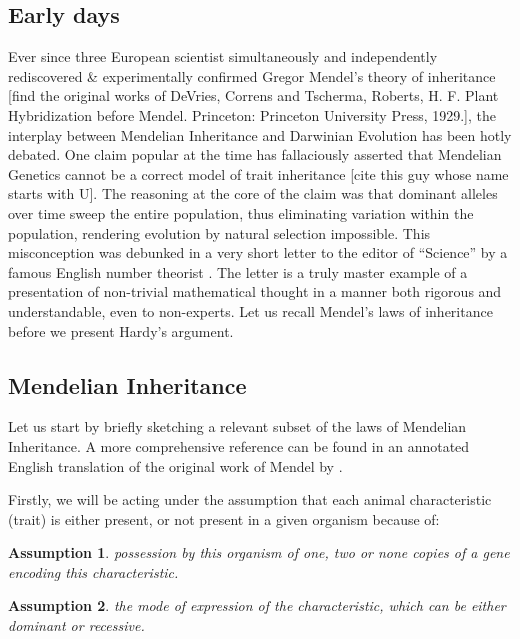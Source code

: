 \documentclass{l4proj}
\newtheorem{assum}{Assumption}
\begin{document}
\subsection{Early days}
Ever since three European scientist simultaneously and independently rediscovered \& experimentally confirmed Gregor Mendel's theory of inheritance [find the original works of DeVries, Correns and Tscherma, Roberts, H. F. Plant Hybridization before Mendel. Princeton: Princeton University Press, 1929.], the interplay between Mendelian Inheritance and Darwinian Evolution has been hotly debated. One claim popular at the time has fallaciously asserted that Mendelian Genetics cannot be a correct model of trait inheritance [cite this guy whose name starts with U]. The reasoning at the core of the claim was that dominant alleles over time sweep the entire population, thus eliminating variation within the population, rendering evolution by natural selection impossible. This misconception was debunked in a very short letter to the editor of ``Science'' by a famous English number theorist \parencite{hardy08}. The letter is a truly master example of a presentation of non-trivial mathematical thought in a manner both rigorous and understandable, even to non-experts. Let us recall Mendel's laws of inheritance before we present Hardy's argument.

\subsection{Mendelian Inheritance}

Let us start by briefly sketching a relevant subset of the laws of Mendelian Inheritance. A more comprehensive reference can be found in an annotated English translation of the original work of Mendel by \cite{mendel}.

Firstly, we will be acting under the assumption that each animal characteristic (trait) is either present, or not present in a given organism because of:
\begin{assum}\label{genotypes}
  possession by this organism of one, two or none copies of a gene encoding this characteristic.
\end{assum}

\begin{assum}\label{dominance}
  the mode of expression of the characteristic, which can be either dominant or recessive.
\end{assum}
\end{document}
